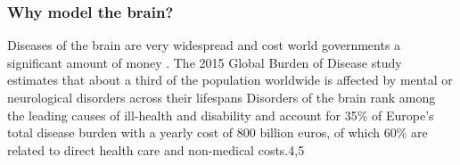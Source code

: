 

\subsubsection{Why model the brain?}
Diseases of the brain are very widespread and cost world governments a significant amount of money \cite{who}.
The 2015 Global Burden of Disease study estimates that about a third of the population worldwide is affected by mental or neurological disorders across their lifespans
Disorders of the brain rank among the leading causes of ill-health and disability and account for 35\% of Europe’s total disease burden with a yearly cost of 800 billion euros, of which 60\% are related to direct health care and non-medical costs.4,5 %

